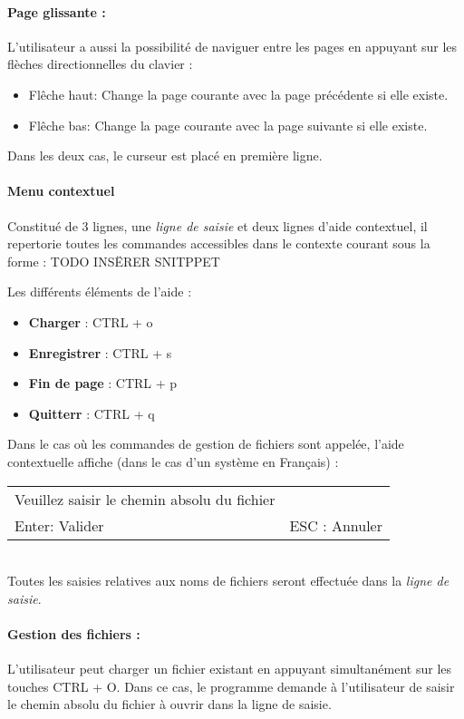 \paragraph{Page glissante :}
L'utilisateur a aussi la possibilité de naviguer entre les pages en appuyant sur les flèches directionnelles du clavier :
\begin{itemize}
	\item \og Flêche haut\fg : Change la page courante avec la page précédente si elle existe.
	\item \og Flêche bas\fg : Change la page courante avec la page suivante si elle existe.
\end{itemize}
Dans les deux cas, le curseur est placé en première ligne.

\paragraph{Menu contextuel}
Constitué de 3 lignes, une \textsl{ligne de saisie} et deux lignes d'aide contextuel, il repertorie toutes les commandes accessibles dans le contexte courant sous la forme :
TODO INSËRER SNITPPET

Les différents éléments de l'aide :
\begin{itemize}
	\item \textbf{Charger} : \og CTRL + o\fg
	\item \textbf{Enregistrer} : \og CTRL + s\fg
	\item \textbf{Fin de page} : \og CTRL + p\fg
	\item \textbf{Quitterr} : \og CTRL + q\fg
\end{itemize}

Dans le cas où les commandes de gestion de fichiers sont appelée, l'aide contextuelle affiche (dans le cas d'un système en Français) :\\
\begin{tabular}{ll}
	Veuillez saisir le chemin absolu du fichier &~\\
	Enter: Valider & ESC : Annuler\\
\end{tabular}
~\\
Toutes les saisies relatives aux noms de fichiers seront effectuée dans la \textsl{ligne de saisie}.

\paragraph{Gestion des fichiers :}
L'utilisateur peut charger un fichier existant en appuyant simultanément sur les touches \og CTRL + O\fg. Dans ce cas, le programme demande à l'utilisateur de saisir le chemin absolu du fichier à ouvrir dans la ligne de saisie.

